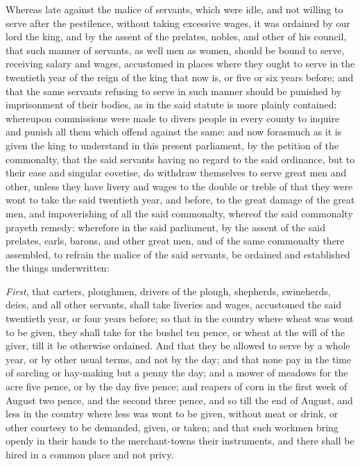 \documentclass[
  letterpaper,
  11pt,
  DIV=9,
  openright]{scrbook}
\begin{document}
Whereas late against the malice of servants, which were idle, and not
willing to serve after the pestilence, without taking excessive wages,
it was ordained by our lord the king, and by the assent of the prelates,
nobles, and other of his council, that such manner of servants, as well
men as women, should be bound to serve, receiving salary and wages,
accustomed in places where they ought to serve in the twentieth year of
the reign of the king that now is, or five or six years before; and that
the same servants refusing to serve in such manner should be punished by
imprisonment of their bodies, as in the said statute is more plainly
contained: whereupon commissions were made to divers people in every
county to inquire and punish all them which offend against the same: and
now forasmuch as it is given the king to understand in this present
parliament, by the petition of the commonalty, that the said servants
having no regard to the said ordinance, but to their ease and singular
covetise, do withdraw themselves to serve great men and other, unless
they have livery and wages to the double or treble of that they were
wont to take the said twentieth year, and before, to the great damage of
the great men, and impoverishing of all the said commonalty, whereof the
said commonalty prayeth remedy: wherefore in the said parliament, by the
assent of the said prelates, earls, barons, and other great men, and of
the same commonalty there assembled, to refrain the malice of the said
servants, be ordained and established the things underwritten:


\emph{First}, that carters, ploughmen, drivers of the plough, shepherds,
swineherds, deies, and all other servants, shall take liveries and
wages, accustomed the said twentieth year, or four years before; so that
in the country where wheat was wont to be given, they shall take for the
bushel ten pence, or wheat at the will of the giver, till it be
otherwise ordained. And that they be allowed to serve by a whole year,
or by other usual terms, and not by the day; and that none pay in the
time of sarcling or hay-making but a penny the day; and a mower of
meadows for the acre five pence, or by the day five pence; and reapers
of corn in the first week of August two pence, and the second three
pence, and so till the end of August, and less in the country where less
was wont to be given, without meat or drink, or other courtesy to be
demanded, given, or taken; and that such workmen bring openly in their
hands to the merchant-towns their instruments, and there shall be hired
in a common place and not privy.
\end{document}
